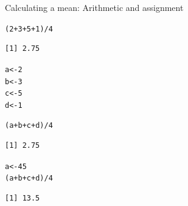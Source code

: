 \documentclass[10pt]{beamer}\usepackage[]{graphicx}\usepackage[]{color}
\makeatletter
\newcommand{\hlnum}[1]{\textcolor[rgb]{0.686,0.059,0.569}{#1}}%
\newcommand{\hlopt}[1]{\textcolor[rgb]{0,0,0}{#1}}%
\newcommand{\hlstd}[1]{\textcolor[rgb]{0.345,0.345,0.345}{#1}}%
\newcommand{\hlkwb}[1]{\textcolor[rgb]{0.69,0.353,0.396}{#1}}%
\newenvironment{kframe}{%
 \def\at@end@of@kframe{}%
 \ifinner\ifhmode%
  \def\at@end@of@kframe{\end{minipage}}%
  \begin{minipage}{\columnwidth}%
 \fi\fi%
 \def\FrameCommand##1{\hskip\@totalleftmargin \hskip-\fboxsep
 \colorbox{shadecolor}{##1}\hskip-\fboxsep
     \hskip-\linewidth \hskip-\@totalleftmargin \hskip\columnwidth}%
 \MakeFramed {\advance\hsize-\width
   \@totalleftmargin\z@ \linewidth\hsize
   \@setminipage}}%
 {\par\unskip\endMakeFramed%
 \at@end@of@kframe}
\newenvironment{knitrout}{}{} %
\makeatother
\begin{document}
\begin{frame}[fragile]{Calculating a mean: Arithmetic and assignment}

\begin{knitrout}
\color{fgcolor}\begin{kframe}
\begin{alltt}
  \hlstd{(}\hlnum{2} \hlopt{+} \hlnum{3} \hlopt{+} \hlnum{5} \hlopt{+} \hlnum{1}\hlstd{)} \hlopt{/} \hlnum{4}
\end{alltt}
\begin{verbatim}
[1] 2.75
\end{verbatim}
\end{kframe}
\end{knitrout}
\pause
\begin{knitrout}
\color{fgcolor}\begin{kframe}
\begin{alltt}
  \hlstd{a} \hlkwb{<-} \hlnum{2}
  \hlstd{b} \hlkwb{<-} \hlnum{3}
  \hlstd{c} \hlkwb{<-} \hlnum{5}
  \hlstd{d} \hlkwb{<-} \hlnum{1}

  \hlstd{(a} \hlopt{+} \hlstd{b} \hlopt{+} \hlstd{c} \hlopt{+} \hlstd{d)} \hlopt{/} \hlnum{4}
\end{alltt}
\begin{verbatim}
[1] 2.75
\end{verbatim}
\end{kframe}
\end{knitrout}
\pause
\begin{knitrout}
\color{fgcolor}\begin{kframe}
\begin{alltt}
  \hlstd{a} \hlkwb{<-} \hlnum{45}
  \hlstd{(a} \hlopt{+} \hlstd{b} \hlopt{+} \hlstd{c} \hlopt{+} \hlstd{d)} \hlopt{/} \hlnum{4}
\end{alltt}
\begin{verbatim}
[1] 13.5
\end{verbatim}
\end{kframe}
\end{knitrout}
\end{frame}
\end{document}
